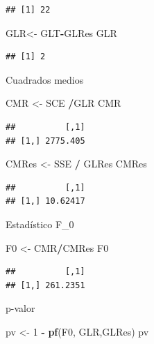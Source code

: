 \documentclass[
]{book}
\newenvironment{Shaded}{\begin{snugshade}}{\end{snugshade}}
\newcommand{\DecValTok}[1]{\textcolor[rgb]{0.00,0.00,0.81}{#1}}
\newcommand{\FunctionTok}[1]{\textcolor[rgb]{0.13,0.29,0.53}{\textbf{#1}}}
\newcommand{\NormalTok}[1]{#1}
\newcommand{\OtherTok}[1]{\textcolor[rgb]{0.56,0.35,0.01}{#1}}
\newcommand{\SpecialCharTok}[1]{\textcolor[rgb]{0.81,0.36,0.00}{\textbf{#1}}}
\begin{document}
\begin{verbatim}
## [1] 22
\end{verbatim}

\begin{Shaded}
\begin{Highlighting}[]
\NormalTok{GLR}\OtherTok{\textless{}{-}}\NormalTok{ GLT}\SpecialCharTok{{-}}\NormalTok{GLRes}
\NormalTok{GLR}
\end{Highlighting}
\end{Shaded}

\begin{verbatim}
## [1] 2
\end{verbatim}

Cuadrados medios

\begin{Shaded}
\begin{Highlighting}[]
\NormalTok{CMR }\OtherTok{\textless{}{-}}\NormalTok{ SCE }\SpecialCharTok{/}\NormalTok{GLR}
\NormalTok{CMR}
\end{Highlighting}
\end{Shaded}

\begin{verbatim}
##          [,1]
## [1,] 2775.405
\end{verbatim}

\begin{Shaded}
\begin{Highlighting}[]
\NormalTok{CMRes }\OtherTok{\textless{}{-}}\NormalTok{ SSE }\SpecialCharTok{/}\NormalTok{ GLRes}
\NormalTok{CMRes}
\end{Highlighting}
\end{Shaded}

\begin{verbatim}
##          [,1]
## [1,] 10.62417
\end{verbatim}

Estadístico F\_0

\begin{Shaded}
\begin{Highlighting}[]
\NormalTok{F0 }\OtherTok{\textless{}{-}}\NormalTok{ CMR}\SpecialCharTok{/}\NormalTok{CMRes}
\NormalTok{F0}
\end{Highlighting}
\end{Shaded}

\begin{verbatim}
##          [,1]
## [1,] 261.2351
\end{verbatim}

p-valor

\begin{Shaded}
\begin{Highlighting}[]
\NormalTok{pv }\OtherTok{\textless{}{-}} \DecValTok{1} \SpecialCharTok{{-}} \FunctionTok{pf}\NormalTok{(F0, GLR,GLRes)}
\NormalTok{pv}
\end{Highlighting}
\end{Shaded}
\end{document}
